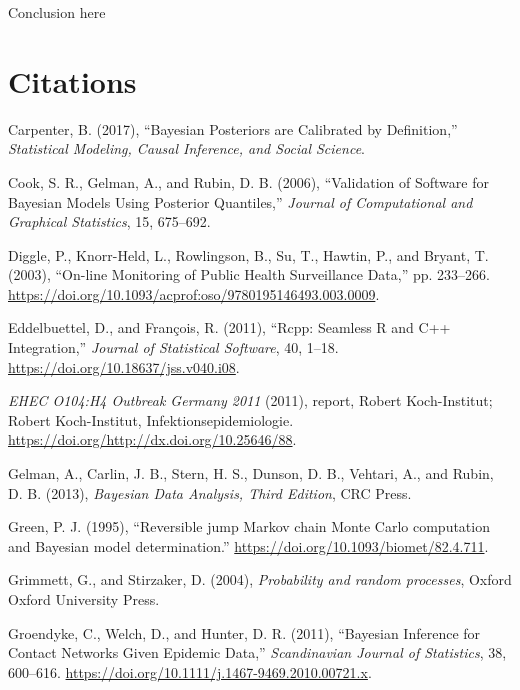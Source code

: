 \documentclass[11pt,a4paper]{article}
\numberwithin{equation}{section}
\begin{document}
Conclusion here

\pagebreak

\hypertarget{citations}{%
\section*{Citations}\label{citations}}

\hypertarget{refs}{}
\leavevmode\hypertarget{ref-carpenter_bayesian_2017}{}%
Carpenter, B. (2017), ``Bayesian Posteriors are Calibrated by
Definition,'' \emph{Statistical Modeling, Causal Inference, and Social
Science}.

\leavevmode\hypertarget{ref-cook_validation_2006}{}%
Cook, S. R., Gelman, A., and Rubin, D. B. (2006), ``Validation of
Software for Bayesian Models Using Posterior Quantiles,'' \emph{Journal
of Computational and Graphical Statistics}, 15, 675--692.

\leavevmode\hypertarget{ref-diggle_-line_2003}{}%
Diggle, P., Knorr-Held, L., Rowlingson, B., Su, T., Hawtin, P., and
Bryant, T. (2003), ``On-line Monitoring of Public Health Surveillance
Data,'' pp. 233--266.
\url{https://doi.org/10.1093/acprof:oso/9780195146493.003.0009}.

\leavevmode\hypertarget{ref-eddelbuettel_rcpp_2011}{}%
Eddelbuettel, D., and François, R. (2011), ``Rcpp: Seamless R and C++
Integration,'' \emph{Journal of Statistical Software}, 40, 1--18.
\url{https://doi.org/10.18637/jss.v040.i08}.

\leavevmode\hypertarget{ref-noauthor_ehec_2011}{}%
\emph{EHEC O104:H4 Outbreak Germany 2011} (2011), report, Robert
Koch-Institut; Robert Koch-Institut, Infektionsepidemiologie.
\url{https://doi.org/http://dx.doi.org/10.25646/88}.

\leavevmode\hypertarget{ref-gelman_bayesian_2013}{}%
Gelman, A., Carlin, J. B., Stern, H. S., Dunson, D. B., Vehtari, A., and
Rubin, D. B. (2013), \emph{Bayesian Data Analysis, Third Edition}, CRC
Press.

\leavevmode\hypertarget{ref-green_reversible_1995}{}%
Green, P. J. (1995), ``Reversible jump Markov chain Monte Carlo
computation and Bayesian model determination.''
\url{https://doi.org/10.1093/biomet/82.4.711}.

\leavevmode\hypertarget{ref-grimmett_probability_2004}{}%
Grimmett, G., and Stirzaker, D. (2004), \emph{Probability and random
processes}, Oxford Oxford University Press.

\leavevmode\hypertarget{ref-groendyke_bayesian_2011}{}%
Groendyke, C., Welch, D., and Hunter, D. R. (2011), ``Bayesian Inference
for Contact Networks Given Epidemic Data,'' \emph{Scandinavian Journal
of Statistics}, 38, 600--616.
\url{https://doi.org/10.1111/j.1467-9469.2010.00721.x}.
\end{document}

